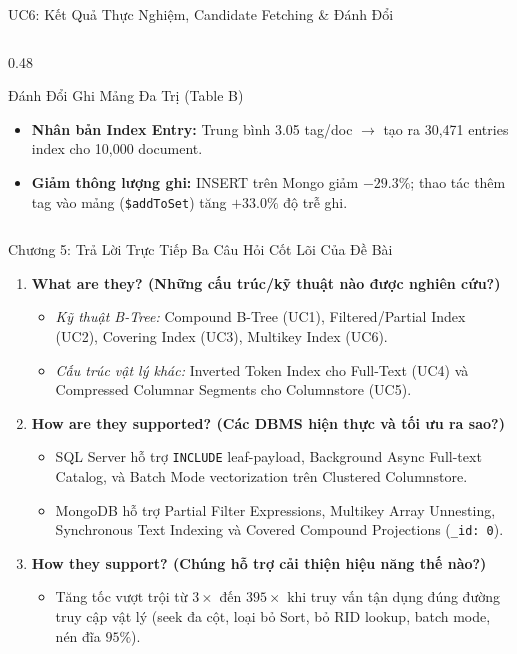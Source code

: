 \documentclass[aspectratio=169,9pt]{beamer}
\begin{document}
\begin{frame}{UC6: Kết Quả Thực Nghiệm, Candidate Fetching \& Đánh Đổi}
\begin{columns}[T]
\begin{column}{0.48\textwidth}
\begin{alertblock}{Đánh Đổi Ghi Mảng Đa Trị (Table B)}
\scriptsize
\begin{itemize}
  \item \textbf{Nhân bản Index Entry:} Trung bình 3.05 tag/doc $\to$ tạo ra 30,471 entries index cho 10,000 document.
  \item \textbf{Giảm thông lượng ghi:} INSERT trên Mongo giảm \textbf{$-29.3\%$}; thao tác thêm tag vào mảng (\texttt{\$addToSet}) tăng \textbf{$+33.0\%$} độ trễ ghi.
\end{itemize}
\end{alertblock}
\end{column}
\end{columns}
\end{frame}

\begin{frame}{Chương 5: Trả Lời Trực Tiếp Ba Câu Hỏi Cốt Lõi Của Đề Bài}
\begin{enumerate}
  \item \textbf{What are they? (Những cấu trúc/kỹ thuật nào được nghiên cứu?)}
  \begin{itemize}
    \item \emph{Kỹ thuật B-Tree:} Compound B-Tree (UC1), Filtered/Partial Index (UC2), Covering Index (UC3), Multikey Index (UC6).
    \item \emph{Cấu trúc vật lý khác:} Inverted Token Index cho Full-Text (UC4) và Compressed Columnar Segments cho Columnstore (UC5).
  \end{itemize}
  \item \textbf{How are they supported? (Các DBMS hiện thực và tối ưu ra sao?)}
  \begin{itemize}
    \item SQL Server hỗ trợ \texttt{INCLUDE} leaf-payload, Background Async Full-text Catalog, và Batch Mode vectorization trên Clustered Columnstore.
    \item MongoDB hỗ trợ Partial Filter Expressions, Multikey Array Unnesting, Synchronous Text Indexing và Covered Compound Projections (\texttt{\_id: 0}).
  \end{itemize}
  \item \textbf{How they support? (Chúng hỗ trợ cải thiện hiệu năng thế nào?)}
  \begin{itemize}
    \item Tăng tốc vượt trội từ $3\times$ đến $395\times$ khi truy vấn tận dụng đúng đường truy cập vật lý (seek đa cột, loại bỏ Sort, bỏ RID lookup, batch mode, nén đĩa $95\%$).
  \end{itemize}
\end{enumerate}
\end{frame}
\end{document}
